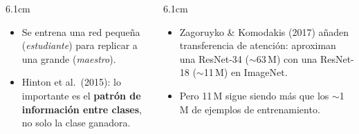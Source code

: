 \documentclass[aspectratio=169, 10pt]{beamer}
\begin{document}
\begin{frame}
\begin{center}
\end{center}
\vspace{0.3em}
\begin{columns}[T]
\begin{column}{6.1cm}
\begin{itemize}
	\item Se entrena una red peque\~na (\emph{estudiante}) para replicar a una grande (\emph{maestro}).
	\item Hinton et al.\ (2015): lo importante es el \textbf{patr\'on de informaci\'on entre clases}, no solo la clase ganadora.
\end{itemize}
\end{column}
\begin{column}{6.1cm}
\begin{itemize}
	\item Zagoruyko \& Komodakis (2017) a\~naden transferencia de atenci\'on: aproximan una ResNet-34 ($\sim$63\,M) con una ResNet-18 ($\sim$11\,M) en ImageNet.
	\item Pero 11\,M sigue siendo m\'as que los $\sim$1\,M de ejemplos de entrenamiento.
\end{itemize}
\end{column}
\end{columns}
\end{frame}
\end{document}
